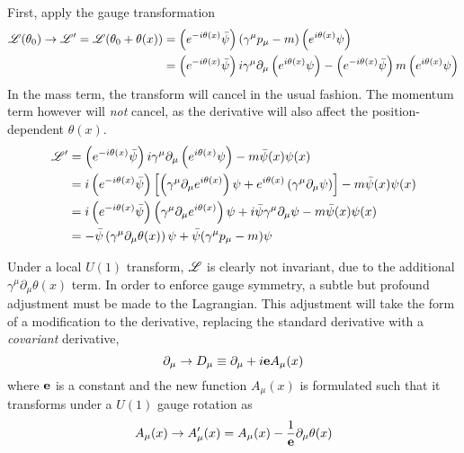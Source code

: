     First, apply the gauge transformation
    \begin{equation} \begin{split}
        \mathscr{L}(\theta_0) \to \mathscr{L}' = \mathscr{L}(\theta_0+\theta(x)) &=
            \left( e^{-i\theta(x)} \bar{\psi} \right) (\gamma^\mu p_\mu - m) \left( e^{i\theta(x)}\psi \right)
            \\ &= \left( e^{-i\theta(x)} \bar{\psi} \right) i\gamma^\mu \partial_\mu \left( e^{i\theta(x)}\psi \right)
                - \left( e^{-i\theta(x)} \bar{\psi} \right) m \left( e^{i\theta(x)}\psi \right)
    \end{split} \end{equation}
    In the mass term, the transform will cancel in the usual fashion.
    The momentum term however will \textit{not} cancel, as the derivative will also affect the position-dependent $\theta(x)$.
    \begin{equation} \begin{split}
        \mathscr{L}' &= \left( e^{-i\theta(x)} \bar{\psi} \right) i\gamma^\mu \partial_\mu \left( e^{i\theta(x)}\psi \right) - m \bar{\psi}(x) \psi(x)
        \\ &= i \left( e^{-i\theta(x)} \bar{\psi} \right) \left[
                \left( \gamma^\mu \partial_\mu e^{i\theta(x)} \right) \psi 
                + e^{i\theta(x)} \left( \gamma^\mu \partial_\mu \psi \right)
            \right] - m \bar{\psi}(x) \psi(x)
        \\ &= i \left( e^{-i\theta(x)} \bar{\psi} \right)
                \left( \gamma^\mu \partial_\mu e^{i\theta(x)} \right) \psi 
            + i \bar{\psi} \gamma^\mu \partial_\mu \psi
            - m \bar{\psi}(x) \psi(x)
        \\ &= - \bar{\psi} \left( \gamma^\mu \partial_\mu\theta(x) \right) \psi 
            + \bar{\psi} ( \gamma^\mu p_\mu - m ) \psi
    \end{split} \end{equation}

    Under a local $U(1)$ transform, $\mathscr{L}$ is clearly not invariant,
        due to the additional $\gamma^\mu \partial_\mu\theta(x)$ term.
    In order to enforce gauge symmetry, a subtle but profound adjustment must be made to the Lagrangian.
    This adjustment will take the form of a modification to the derivative,
        replacing the standard derivative with a \textit{covariant} derivative,
    \begin{equation}
        \partial_\mu \to D_\mu \equiv \partial_\mu + i \mathbf{e} A_\mu(x)
    \end{equation}
    where $\mathbf{e}$ is a constant and the new function $A_\mu(x)$ is formulated such that it transforms under a $U(1)$ gauge rotation as
    \begin{equation}
        A_\mu(x) \to A'_\mu(x) = A_\mu(x) - \frac{1}{\mathbf{e}} \partial_\mu \theta(x)
    \end{equation}

